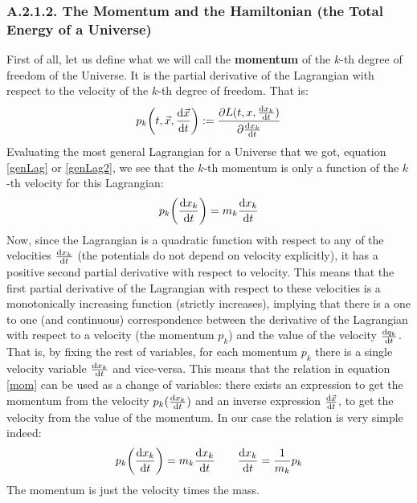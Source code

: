 \documentclass[11pt, a4paper]{article} %
\begin{document}
\subsubsection*{A.2.1.2. The Momentum and the Hamiltonian (the Total Energy of a Universe)}
First of all, let us define what we will call the {\bf momentum} of the $k$-th degree of freedom of the Universe. It is the partial derivative of the Lagrangian with respect to the velocity of the $k$-th degree of freedom. That is:
\begin{equation}
p_k\qty(t,\vec{x},\dv{\vec{x}}{t}):=\pdv{L(t,x,\dv{x_k}{t})}{\dv{x_k}{t}}
\end{equation}
Evaluating the most general Lagrangian for a Universe that we got, equation \eqref{genLag} or \eqref{genLag2}, we see that the $k$-th momentum is only a function of the $k$-th velocity for this Lagrangian:
\begin{equation}\label{mom}
p_k\qty(\dv{x_k}{t})=m_k\dv{x_k}{t}
\end{equation}
Now, since the Lagrangian is a quadratic function with respect to any of the velocities $\dv{x_k}{t}$ (the potentials do not depend on velocity explicitly), it has a positive second partial derivative with respect to velocity. This means that the first partial derivative of the Lagrangian with respect to these velocities is a monotonically increasing function (strictly increases), implying that there is a one to one (and continuous) correspondence between the derivative of the Lagrangian with respect to a velocity (the momentum $p_k$) and the value of the velocity $\dv{q_k}{t}$. That is, by fixing the rest of variables, for each momentum $p_k$ there is a single velocity variable $\dv{x_k}{t}$ and vice-versa. This means that the relation in equation \eqref{mom} can be used as a change of variables: there exists an expression to get the momentum from the velocity $p_k(\dv{x_k}{t})$ and an inverse  expression $\dv{\vec{x}}{t} (p_k)$, to get the velocity from  the value of the momentum. In our case the relation is very simple indeed:
\begin{equation}
p_k\qty(\dv{x_k}{t})=m_k\dv{x_k}{t}\quad \quad \dv{x_k}{t} (p_k)=\frac{1}{m_k}p_k
\end{equation}
The momentum is just the velocity times the mass.
\end{document}
